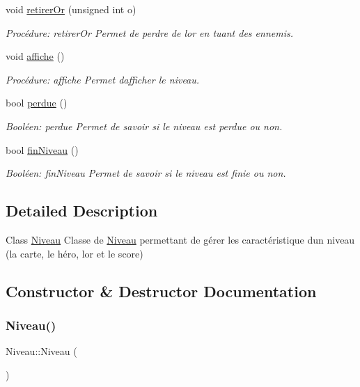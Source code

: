 \begin{DoxyCompactItemize}
void \hyperlink{classNiveau_a3192b7514716cfddac9ff465f9ad1f2f}{retirer\+Or} (unsigned int o)
\begin{DoxyCompactList}\small\item\em Procédure\+: retirer\+Or Permet de perdre de l\textquotesingle{}or en tuant des ennemis. \end{DoxyCompactList}\item 
void \hyperlink{classNiveau_a945a71fd635f9ab1e15dbae04afa5e5d}{affiche} ()
\begin{DoxyCompactList}\small\item\em Procédure\+: affiche Permet d\textquotesingle{}afficher le niveau. \end{DoxyCompactList}\item 
bool \hyperlink{classNiveau_a749c4fbb42a1f47bff1b0b845a214d1a}{perdue} ()
\begin{DoxyCompactList}\small\item\em Booléen\+: perdue Permet de savoir si le niveau est perdue ou non. \end{DoxyCompactList}\item 
bool \hyperlink{classNiveau_ab43feae8b186ed6167b5cadaf2d01cac}{fin\+Niveau} ()
\begin{DoxyCompactList}\small\item\em Booléen\+: fin\+Niveau Permet de savoir si le niveau est finie ou non. \end{DoxyCompactList}\end{DoxyCompactItemize}


\subsection{Detailed Description}
Class \hyperlink{classNiveau}{Niveau} Classe de \hyperlink{classNiveau}{Niveau} permettant de gérer les caractéristique d\textquotesingle{}un niveau (la carte, le héro, l\textquotesingle{}or et le score) 

\subsection{Constructor \& Destructor Documentation}
\mbox{\label{classNiveau_abf99be59a575d462a25c4ade5c124431}} 
\subsubsection{\texorpdfstring{Niveau()}{Niveau()}\hspace{0.1cm}{\footnotesize\ttfamily [1/2]}}
{\footnotesize\ttfamily Niveau\+::\+Niveau (\begin{DoxyParamCaption}{ }\end{DoxyParamCaption})}



